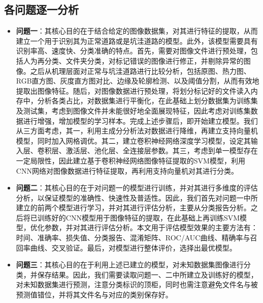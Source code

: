 \documentclass{MathorCupmodeling}
\begin{document}
	\subsection{各问题逐一分析}
	\begin{itemize}
		\item \textbf{问题一}：其核心目的在于{\heiti 结合给定的图像数据集，对其进行特征的提取，从而建立一个用于识别其为正常道路或是坑洼道路的模型}。此外，该模型需要具有{\heiti 识别率高、速度快、分类准确}的特点。首先，需要对图像文件进行预处理，包括人为再分类、文件夹分类，对标记错误的图像进行修正，并剔除异常的图像。之后从机理层面对正常与坑洼道路进行比较分析，包括原图、热力图、RGB直方图、灰度直方图对比、边缘及轮廓检测、以及阈值分割，从而有效地提取出图像特征。随后，对图像数据进行预处理，将划分标记好的文件读入内存中，分析各类占比，对数据集进行平衡化，在此基础上划分数据集为训练集及测试集，考虑到图像文件并未能很好地全面展现特征，因此考虑对训练集数据进行增强，增加模型的学习样本。完成上述步骤后，即开始建立模型。我们从三方面考虑，其一，利用主成分分析法对数据进行降维，再建立支持向量机模型，同时加入网格调优。其二，建立卷积神经网络深度学习模型，设定其输入层、卷积层、激活层、池化层、全连接层参数。其三，考虑到单一模型存在一定局限性，因此建立基于卷积神经网络图像特征提取的SVM模型，利用CNN网络对图像数据进行特征提取，再利用支持向量机对其进行分类。
		\item \textbf{问题二}：其核心目的在于{\heiti 对问题一的模型进行训练，并对其进行多维度的评估分析，以保证模型的准确性、快速性及普适性}。因此，我们首先对问题一中所建立的前两个模型进行学习，并对其进行评估分析，主要从分类报告分析。之后将已训练好的CNN模型用于图像特征的提取，在此基础上再训练SVM模型，优化参数，并对其进行评估分析。本文用于评估模型效果的主要方法有：时间、准确率、损失值、分类报告、混淆矩阵、ROC/AUC曲线、精确率与召回率曲线、交叉验证。最后，对模型进行整体评价，选择出最优模型。
		\item \textbf{问题三}：其核心目的在于{\heiti 利用上述已建立的模型，对未知数据集图像进行分类，并保存结果}。因此，我们需要读取问题一、二中所建立及训练好的模型，对未知数据集进行预测，注意分类标识的顶柜，同时也需注意避免文件名与被预测值错位，并将其文件名与对应的类别保存好。
	\end{itemize}
\end{document}
